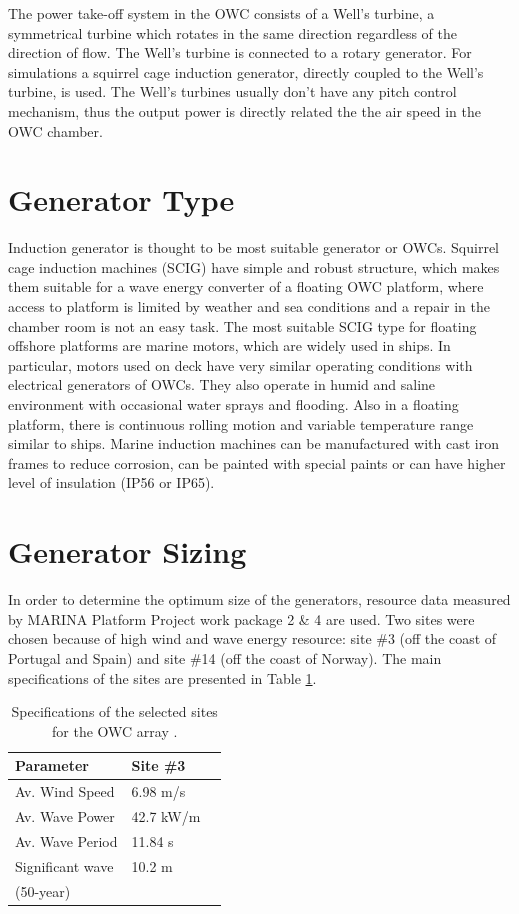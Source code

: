 \documentclass[twocolumn]{article}
\begin{document}
The power take-off system in the OWC consists of a Well's turbine, a symmetrical turbine which rotates in the same direction regardless of the direction of flow. The Well's turbine is connected to a rotary generator. For simulations a squirrel cage induction generator, directly coupled to the Well's turbine, is used. The Well's turbines usually don't have any pitch control mechanism, thus the output power is directly related the the air speed in the OWC chamber.


\section{Generator Type}

Induction generator is thought to be most suitable generator or OWCs. Squirrel cage induction machines (SCIG) have simple and robust structure, which makes them suitable for a wave energy converter of a floating OWC platform, where access to platform is limited by weather and sea conditions and a repair in the chamber room is not an easy task. 
The most suitable SCIG type for floating offshore platforms are marine motors, which are widely used in ships. In particular, motors used on deck have very similar operating conditions with electrical generators of OWCs. They also operate in humid and saline environment with occasional water sprays and flooding. Also in a floating platform, there is continuous rolling motion and variable temperature range similar to ships. Marine induction machines can be manufactured  with cast iron frames to reduce corrosion, can be painted with special paints or can have higher level of insulation (IP56 or IP65). 

\section{Generator Sizing}

In order to determine the optimum size of the generators, resource data measured by MARINA Platform Project work package 2 \& 4 are used. Two sites were chosen because of high wind and wave energy resource: site \#3 (off the coast of Portugal and Spain) and site \#14 (off the coast of Norway). The main specifications of the sites are presented in Table \ref{site_spec}.


\begin{table}
  \centering
  \begin{tabular}{lll}
   Parameter & Site \#3 \\
  \hline
Av. Wind Speed & 6.98 m/s \\
Av. Wave Power & 42.7 kW/m \\
Av. Wave Period & 11.84 s \\
Significant wave & 10.2 m  \\
(50-year) \\
\hline
  \end{tabular}
  \caption{Specifications of the selected sites for the OWC array \cite{Gao2012}.}
  \label{site_spec}
\end{table}
\end{document}
